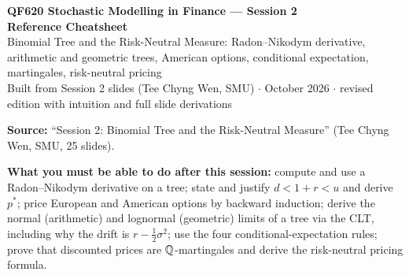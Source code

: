 \documentclass[10pt]{article}
\begin{document}
\begin{center}
{\LARGE\bfseries QF620 Stochastic Modelling in Finance --- Session 2\\[2pt] Reference Cheatsheet}\\[6pt]
{\large Binomial Tree and the Risk-Neutral Measure: Radon--Nikodym derivative, arithmetic and geometric trees, American options, conditional expectation, martingales, risk-neutral pricing}\\[4pt]
{\small Built from Session 2 slides (Tee Chyng Wen, SMU) $\cdot$ October 2026 $\cdot$ revised edition with intuition and full slide derivations}
\end{center}
\tableofcontents
\vspace{4pt}
\textbf{Source:} ``Session 2: Binomial Tree and the Risk-Neutral Measure'' (Tee Chyng Wen, SMU, 25 slides).

\legend

\textbf{What you must be able to do after this session:} compute and use a Radon--Nikodym derivative on a tree; state and justify $d<1+r<u$ and derive $p^*$; price European and American options by backward induction; derive the normal (arithmetic) and lognormal (geometric) limits of a tree via the CLT, including why the drift is $r-\frac12\sigma^2$; use the four conditional-expectation rules; prove that discounted prices are $\mathbb{Q}$-martingales and derive the risk-neutral pricing formula.
\end{document}
